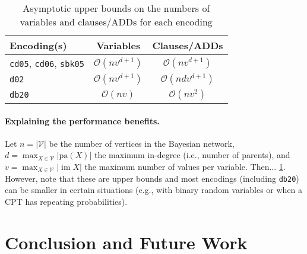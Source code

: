 \documentclass{article}
\theoremstyle{definition}
\theoremstyle{remark}
\DeclareMathOperator{\im}{im}
\begin{document}
{

\begin{table}
  \centering
  \caption{Asymptotic upper bounds on the numbers of variables and clauses/ADDs
    for each encoding}
  \label{tbl:asymptotes}
  \begin{tabular}{lcc}
    \toprule
    Encoding(s) & Variables & Clauses/ADDs \\
    \midrule
    \texttt{cd05}, \texttt{cd06}, \texttt{sbk05} & $\mathcal{O}(nv^{d+1})$ & $\mathcal{O}(nv^{d+1})$ \\
    \texttt{d02} & $\mathcal{O}(nv^{d+1})$ & $\mathcal{O}(ndv^{d+1})$ \\
    \texttt{db20} & $\mathcal{O}(nv)$ & $\mathcal{O}(nv^2)$ \\
    \bottomrule
  \end{tabular}
\end{table}

\paragraph{Explaining the performance benefits.} Let $n = |\mathcal{V}|$ be the
number of vertices in the Bayesian network, $d = \max_{X \in \mathcal{V}}
|\mathrm{pa}(X)|$ the maximum in-degree (i.e., number of parents), and $v =
\max_{X \in \mathcal{V}} |\im X|$ the maximum number of values per variable.
Then... \cref{tbl:asymptotes}. However, note that these are upper bounds and
most encodings (including \texttt{db20}) can be smaller in certain situations
(e.g., with binary random variables or when a CPT has repeating probabilities).


\section{Conclusion and Future Work}

}
\end{document}
